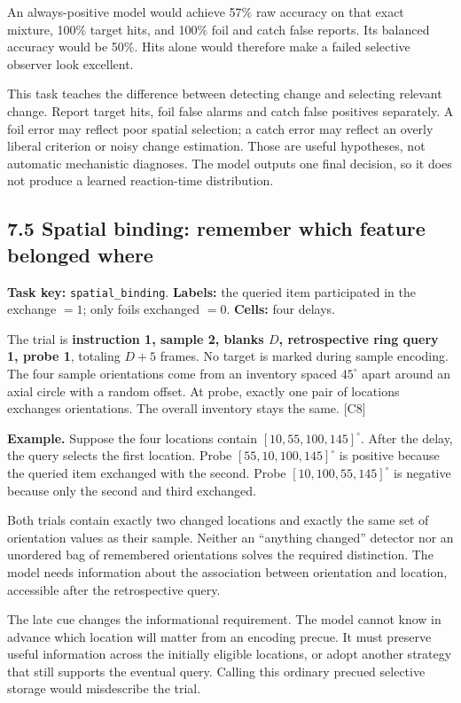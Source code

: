 \documentclass[
  11pt,
]{article}
\let\oldsubsection\subsection
\renewcommand{\subsection}{\Needspace{6\baselineskip}\oldsubsection}
\begin{document}
An always-positive model would achieve 57\% raw accuracy on that exact
mixture, 100\% target hits, and 100\% foil and catch false reports. Its
balanced accuracy would be 50\%. Hits alone would therefore make a
failed selective observer look excellent.

This task teaches the difference between detecting change and selecting
relevant change. Report target hits, foil false alarms and catch false
positives separately. A foil error may reflect poor spatial selection; a
catch error may reflect an overly liberal criterion or noisy change
estimation. Those are useful hypotheses, not automatic mechanistic
diagnoses. The model outputs one final decision, so it does not produce
a learned reaction-time distribution.

\subsection{7.5 Spatial binding: remember which feature belonged
where}\label{spatial-binding-remember-which-feature-belonged-where}

\textbf{Task key:} \texttt{spatial\_binding}. \textbf{Labels:} the
queried item participated in the exchange \(=1\); only foils exchanged
\(=0\). \textbf{Cells:} four delays.

The trial is \textbf{instruction 1, sample 2, blanks \(D\),
retrospective ring query 1, probe 1}, totaling \(D+5\) frames. No target
is marked during sample encoding. The four sample orientations come from
an inventory spaced \(45^\circ\) apart around an axial circle with a
random offset. At probe, exactly one pair of locations exchanges
orientations. The overall inventory stays the same. {[}C8{]}

\textbf{Example.} Suppose the four locations contain
\([10,55,100,145]^\circ\). After the delay, the query selects the first
location. Probe \([55,10,100,145]^\circ\) is positive because the
queried item exchanged with the second. Probe \([10,100,55,145]^\circ\)
is negative because only the second and third exchanged.

Both trials contain exactly two changed locations and exactly the same
set of orientation values as their sample. Neither an ``anything
changed'' detector nor an unordered bag of remembered orientations
solves the required distinction. The model needs information about the
association between orientation and location, accessible after the
retrospective query.

The late cue changes the informational requirement. The model cannot
know in advance which location will matter from an encoding precue. It
must preserve useful information across the initially eligible
locations, or adopt another strategy that still supports the eventual
query. Calling this ordinary precued selective storage would misdescribe
the trial.
\end{document}
